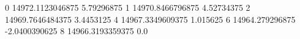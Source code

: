 0 14972.1123046875 5.79296875
1 14970.8466796875 4.52734375
2 14969.7646484375 3.4453125
4 14967.3349609375 1.015625
6 14964.279296875 -2.0400390625
8 14966.3193359375 0.0
